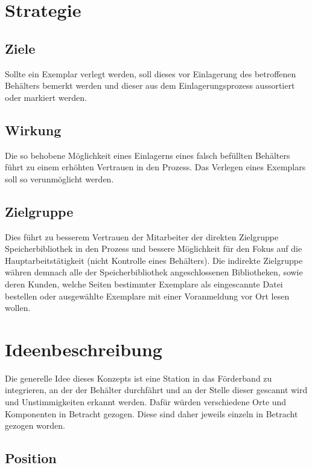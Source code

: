 \chapter{Strategie}

\section{Ziele}
Sollte ein Exemplar verlegt werden, soll dieses vor Einlagerung des betroffenen Behälters bemerkt werden und dieser aus dem Einlagerungsprozess aussortiert oder markiert werden.

\section{Wirkung}
Die so behobene Möglichkeit eines Einlagerns eines falsch befüllten Behälters führt zu einem erhöhten Vertrauen in den Prozess. Das Verlegen eines Exemplars soll so verunmöglicht werden.

\section{Zielgruppe}
Dies führt zu besserem Vertrauen der Mitarbeiter der direkten Zielgruppe Speicherbibliothek in den Prozess und bessere Möglichkeit für den Fokus auf die Hauptarbeitstätigkeit (nicht Kontrolle eines Behälters). Die indirekte Zielgruppe währen demnach alle der Speicherbibliothek angeschlossenen Bibliotheken, sowie deren Kunden, welche Seiten bestimmter Exemplare als eingescannte Datei bestellen oder ausgewählte Exemplare mit einer Voranmeldung vor Ort lesen wollen.

\chapter{Ideenbeschreibung}

Die generelle Idee dieses Konzepts ist eine Station in das Förderband zu integrieren, an der der Behälter durchfährt und an der Stelle dieser gescannt wird und Unstimmigkeiten erkannt werden. Dafür würden verschiedene Orte und Komponenten in Betracht gezogen. Diese sind daher jeweils einzeln in Betracht gezogen worden.

\section{Position}

